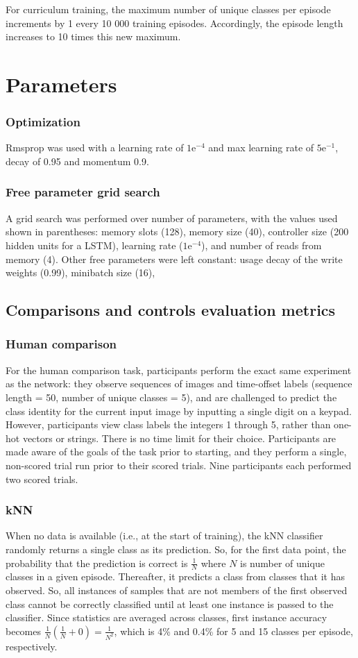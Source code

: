\documentclass{article}
\begin{document}
For curriculum training, the maximum number of unique classes per episode increments by 1 every 10 000 training episodes. Accordingly, the episode length increases to 10 times this new maximum.

\section{Parameters}
\subsubsection{Optimization}
Rmsprop was used with a learning rate of $1\text{e}^{-4}$ and max learning rate of $5\text{e}^{-1}$, decay of 0.95 and momentum 0.9. 

\subsubsection{Free parameter grid search}
A grid search was performed over number of parameters, with the values used shown in parentheses: memory slots (128), memory size (40), controller size (200 hidden units for a LSTM), learning rate ($1\text{e}^{-4}$), and number of reads from memory (4). Other free parameters were left constant: usage decay of the write weights (0.99), minibatch size (16),  

\subsection{Comparisons and controls evaluation metrics}
\subsubsection{Human comparison}
For the human comparison task, participants perform the exact same experiment as the network: they observe sequences of images and time-offset labels (sequence length = 50, number of unique classes = 5), and are challenged to predict the class identity for the current input image by inputting a single digit on a keypad. However, participants view class labels the integers 1 through 5, rather than one-hot vectors or strings. There is no time limit for their choice. Participants are made aware of the goals of the task prior to starting, and they perform a single, non-scored trial run prior to their scored trials. Nine participants each performed two scored trials.

\subsubsection{kNN}
When no data is available (i.e., at the start of training), the kNN classifier randomly returns a single class as its prediction. So, for the first data point, the probability that the prediction is correct is $\frac{1}{N}$ where $N$ is number of unique classes in a given episode. Thereafter, it predicts a class from classes that it has observed. So, all instances of samples that are not members of the first observed class cannot be correctly classified until at least one instance is passed to the classifier. Since statistics are averaged across classes, first instance accuracy becomes $\frac{1}{N}(\frac{1}{N} + 0) = \frac{1}{N^2}$, which is 4\% and 0.4\% for 5 and 15 classes per episode, respectively. 
\end{document}
